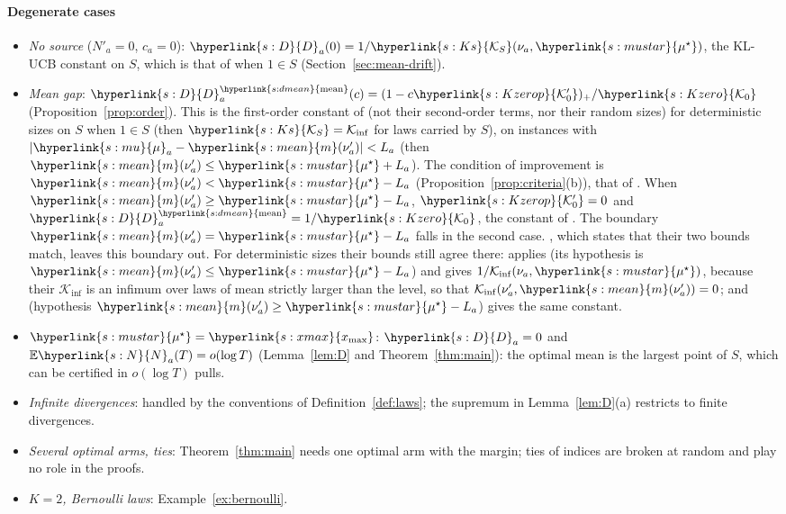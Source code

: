 \documentclass[11pt]{article}
\newcommand{\E}{\mathbb{E}}
\newcommand{\Kinf}{\mathcal{K}_{\inf}}
\newcommand{\sy}[2]{{\hyperlink{#1}{#2}}}
\newcommand{\xmax}{\sy{s:xmax}{x_{\max}}}
\newcommand{\mean}{\sy{s:mean}{m}}
\newcommand{\Ks}{\sy{s:Ks}{\mathcal{K}_{S}}}
\newcommand{\dmean}{\sy{s:dmean}{\mathrm{mean}}}
\newcommand{\mk}{\sy{s:mu}{\mu}}
\newcommand{\mus}{\sy{s:mustar}{\mu^{\star}}}
\newcommand{\Nc}{\sy{s:N}{N}}
\newcommand{\Dc}{\sy{s:D}{D}}
\newcommand{\Ko}{\sy{s:Kzero}{\mathcal{K}_{0}}}
\newcommand{\Kop}{\sy{s:Kzerop}{\mathcal{K}'_{0}}}
\begin{document}
\paragraph{Degenerate cases}

\begin{itemize}
\item \emph{No source} ($N'_a=0$, $c_a=0$): $\Dc_a(0)=1/\Ks(\nu_a,\mus)$, the KL-UCB constant on
  $S$, which is that of \citet[Theorem~2]{CGMMS13} when $1\in S$ (Section~\ref{sec:mean-drift}).
\item \emph{Mean gap}: $\Dc^{\dmean}_a(c)=(1-c\Kop)_+/\Ko$ (Proposition~\ref{prop:order}). This is the
  first-order constant of \citet[Theorems~2(i) and~3(i)]{PMRM26} (not their second-order terms, nor
  their random sizes) for deterministic sizes on $S$ when $1\in S$ (then $\Ks=\Kinf$ for laws carried
  by $S$), on instances with $|\mk_a-\mean(\nu'_a)|<L_a$ (then $\mean(\nu'_a)\le\mus+L_a$). The
  condition of improvement is $\mean(\nu'_a)<\mus-L_a$ (Proposition~\ref{prop:criteria}(b)), that
  of \citet[Section~6]{PMRM26}. When $\mean(\nu'_a)\ge\mus-L_a$, $\Kop=0$ and $\Dc^{\dmean}_a=1/\Ko$,
  the constant of \citet[Theorems~2(ii) and~3(ii)]{PMRM26}. The boundary $\mean(\nu'_a)=\mus-L_a$
  falls in the second case. \citet[Proposition~4]{PMRM26}, which states that their two bounds
  match, leaves this boundary out. For deterministic sizes their bounds still agree there:
  \citet[Theorem~2(i)]{PMRM26} applies (its hypothesis is $\mean(\nu'_a)\le\mus-L_a$) and gives
  $1/\Kinf(\nu_a,\mus)$, because their $\Kinf$ is an infimum over laws of mean strictly larger than
  the level, so that $\Kinf(\nu'_a,\mean(\nu'_a))=0$; and \citet[Theorem~3(ii)]{PMRM26} (hypothesis
  $\mean(\nu'_a)\ge\mus-L_a$) gives the same constant.
\item \emph{$\mus=\xmax$}: $\Dc_a=0$ and $\E \Nc_a(T)=o(\log T)$ (Lemma~\ref{lem:D} and
  Theorem~\ref{thm:main}): the optimal mean is the largest point of $S$, which can be certified in
  $o(\log T)$ pulls.
\item \emph{Infinite divergences}: handled by the conventions of Definition~\ref{def:laws}; the
  supremum in Lemma~\ref{lem:D}(a) restricts to finite divergences.
\item \emph{Several optimal arms, ties}: Theorem~\ref{thm:main} needs one optimal arm with the
  margin; ties of indices are broken at random and play no role in the proofs.
\item \emph{$K=2$, Bernoulli laws}: Example~\ref{ex:bernoulli}.
\end{itemize}
\end{document}
